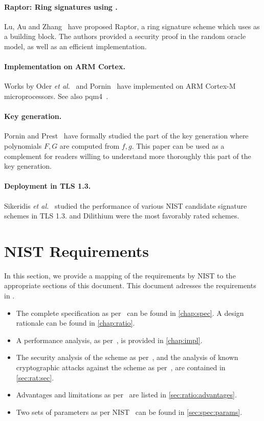 \paragraph{Raptor: Ring signatures using \falcon.}  Lu, Au and Zhang~\cite{EPRINT:LuAuZha18} have proposed Raptor, a ring signature scheme which uses \falcon as a building block. The authors provided a security proof in the random oracle model, as well as an efficient implementation.

\paragraph{Implementation on ARM Cortex.} Works by Oder \textit{et al.}~\cite{PQCRYPTO:OSHG19} and Pornin~\cite{EPRINT:Pornin19} have implemented \falcon on ARM Cortex-M microprocessors. See also pqm4~\cite{EPRINT:KRSS19}.

\paragraph{Key generation.} Pornin and Prest~\cite{PKC:PorPre19} have formally studied the part of the key generation where polynomials $F,G$ are computed from $f,g$.
This paper can be used as a complement for readers willing to understand more thoroughly this part of the key generation.

\paragraph{Deployment in TLS 1.3.} Sikeridis \textit{et al.}~\cite{NDSS:SikKamDev20} studied the performance of various NIST candidate signature schemes in TLS 1.3. \falcon and Dilithium were the most favorably rated schemes.

\section{NIST Requirements}

In this section, we provide a mapping of the requirements by NIST to the appropriate sections of this document. This document adresses the requirements in \cite[Section 2.B]{NIST}.
 \begin{itemize}
  \item The complete specification as per~\cite[Section 2.B.1]{NIST} can be found in \cref{chap:spec}. A design rationale can be found in \cref{chap:ratio}.
  \item A performance analysis, as per~\cite[Section 2.B.2]{NIST}, is provided in \cref{chap:impl}.
  \item The security analysis of the scheme as per~\cite[Section 2.B.4]{NIST}, and the analysis of known cryptographic attacks against the scheme as per~\cite[Section 2.B.5]{NIST}, are contained in \cref{sec:rat:sec}.
  \item Advantages and limitations as per~\cite[Section 2.B.6]{NIST} are listed in \cref{sec:ratio:advantages}.
  \item Two sets of parameters as per NIST~\cite[Section 4.A.5]{NIST} can be found in \cref{sec:spec:params}.
 \end{itemize}


